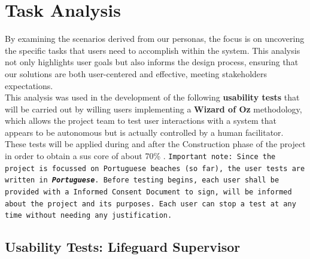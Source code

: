 \section{Task Analysis}
\label{section:task_analysis}
By examining the scenarios derived from our personas, the focus is on uncovering the specific tasks that users need to accomplish within the system. This analysis not only highlights user goals but also informs the design process, ensuring that our solutions are both user-centered and effective, meeting stakeholders expectations. 
\\
This analysis was used in the development of the following \textbf{usability tests} that will be carried out by willing users implementing a \textbf{Wizard of Oz} methodology, which allows the project team to test user interactions with a system that appears to be autonomous but is actually controlled by a human facilitator.
\\
These tests will be applied during and after the Construction phase of the project in order to obtain a \ac{sus} core of about 70\% . 
\texttt{Important note: Since the project is focussed on Portuguese beaches (so far), the user tests are written in \textbf{\textit{Portuguese}}. Before testing begins, each user shall be provided with a Informed Consent Document to sign, will be informed about the project and its purposes. Each user can stop a test at any time without needing any justification.}
\newpage
\subsection{Usability Tests: Lifeguard Supervisor}
\label{section:task_supervior}


